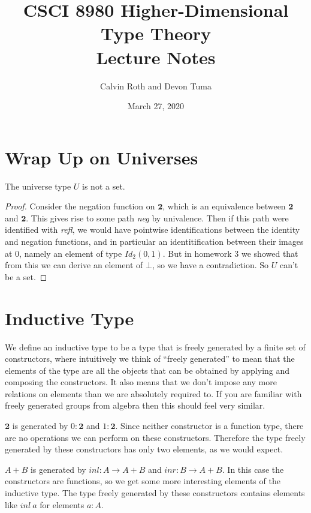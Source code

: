 \documentclass[11pt]{article}
\title{CSCI 8980 Higher-Dimensional Type Theory\\ Lecture Notes}
\author{Calvin Roth and Devon Tuma}
\date{March 27, 2020}
\newcommand{\2}{\textbf{2}}
\begin{document}
\maketitle

\section{Wrap Up on Universes}

\begin{theorem}
The universe type $U$ is not a set. 
\end{theorem}
\begin{proof}
Consider the negation function on $\2$, which is an equivalence between $\2$ and $\2$.
This gives rise to some path \textit{neg} by univalence. 
Then if this path were identified with \textit{refl}, we would have pointwise identifications between the identity and negation functions, and in particular an identitification between their images at $0$, namely an element of type $Id_2(0,1)$.
But in homework $3$ we showed that from this we can derive an element of $\bot$, so we have a contradiction.
So $U$ can't be a set.
\end{proof}

\section{Inductive Type}
We define an inductive type to be a type that is freely generated by a finite set of constructors, where intuitively we think of ``freely generated'' to mean that the elements of the type are all the objects that can be obtained by applying and composing the constructors. It also means that we don't impose any more relations on elements than we are absolutely required to. If you are familiar with freely generated groups from algebra then this should feel very similar.

\begin{example}
  $\2$ is generated by $0 : \2$ and $1 : \2$. Since neither constructor is a function type, there are no operations we can perform on these constructors. Therefore the type freely generated by these constructors has only two elements, as we would expect.
\end{example}

\begin{example}
  $A + B$ is generated by $inl : A \to A + B$ and $inr : B \to A + B$. In this case the constructors are functions, so we get some more interesting elements of the inductive type. The type freely generated by these constructors contains elements like $inl\ a$ for elements $a : A$. 
\end{example}
    
\end{document}

